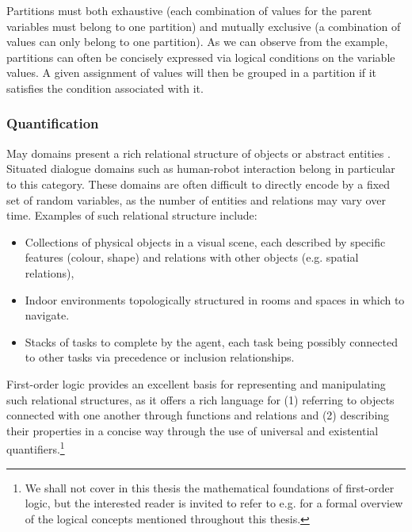 Partitions must both exhaustive (each combination of values for the parent variables must belong to one partition) and mutually exclusive (a combination of values can only belong to one partition).  As we can observe from the example, partitions can often be concisely expressed via logical conditions on the variable values.  A given assignment of values will then be grouped in a partition if it satisfies the condition associated with it.

\subsubsection*{Quantification}

May domains present a rich relational structure of objects or abstract entities \citep{Otterlo2006,Getoor+al:SRL07}. Situated dialogue domains such as human-robot interaction belong in particular to this category.  These domains are often difficult to directly encode by a fixed set of random variables, as the number of entities and relations may vary over time.  Examples of such relational structure include: 
\begin{itemize}
\item Collections of physical objects in a visual scene, each described by specific features (colour, shape) and relations with other objects (e.g. spatial relations),
\item Indoor environments topologically structured in rooms and spaces in which to navigate. 
\item Stacks of tasks to complete by the agent, each task being possibly connected to other tasks via precedence or inclusion relationships.
\end{itemize}

First-order logic provides an excellent basis for representing and manipulating such relational structures, as it offers a rich language for (1) referring to objects connected with one another through functions and relations and (2) describing their properties in a concise way through the use of universal and existential quantifiers.\footnote{We shall not cover in this thesis the mathematical foundations of first-order logic, but the interested reader is invited to refer to e.g. \cite{gamut1991logic} for a formal overview of the logical concepts mentioned throughout this thesis.}

